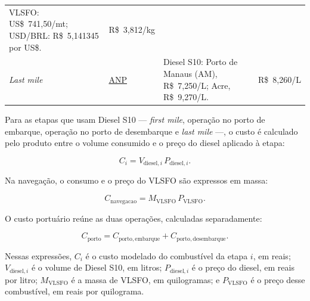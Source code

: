 \documentclass[brazil,]{article}
\begin{document}
\begin{longtable}[]{@{}llll@{}}
\begin{minipage}[t]{0.22\columnwidth}
VLSFO: US\$~741,50/mt; \newline{} USD/BRL: R\$~5,141345 por US\$.\strut
\end{minipage} & \begin{minipage}[t]{0.22\columnwidth}\raggedright
R\$~3,812/kg\strut
\end{minipage}\tabularnewline
\begin{minipage}[t]{0.22\columnwidth}\raggedright
\emph{Last mile}\strut
\end{minipage} & \begin{minipage}[t]{0.22\columnwidth}\raggedright
\href{https://www.gov.br/anp/pt-br/assuntos/precos-e-defesa-da-concorrencia/precos/levantamento-de-precos-de-combustiveis-ultimas-semanas-pesquisadas}{ANP}\strut
\end{minipage} & \begin{minipage}[t]{0.22\columnwidth}\raggedright
Diesel S10: \newline{} Porto de Manaus (AM), R\$~7,250/L; \newline{}
Acre, R\$~9,270/L.\strut
\end{minipage} & \begin{minipage}[t]{0.22\columnwidth}\raggedright
R\$~8,260/L\strut
\end{minipage}\tabularnewline
\bottomrule
\end{longtable}

Para as etapas que usam Diesel S10 --- \emph{first mile}, operação no
porto de embarque, operação no porto de desembarque e \emph{last mile}
---, o custo é calculado pelo produto entre o volume consumido e o preço
do diesel aplicado à etapa:

\[
C_i
=V_{\mathrm{diesel},i}\,P_{\mathrm{diesel},i}.
\]

Na navegação, o consumo e o preço do VLSFO são expressos em massa:

\[
C_{\mathrm{navegacao}}
=M_{\mathrm{VLSFO}}\,P_{\mathrm{VLSFO}}.
\]

O custo portuário reúne as duas operações, calculadas separadamente:

\[
C_{\mathrm{porto}}
=C_{\mathrm{porto,embarque}}
+C_{\mathrm{porto,desembarque}}.
\]

Nessas expressões, \(C_i\) é o custo modelado do combustível da etapa
\(i\), em reais; \(V_{\mathrm{diesel},i}\) é o volume de Diesel S10, em
litros; \(P_{\mathrm{diesel},i}\) é o preço do diesel, em reais por
litro; \(M_{\mathrm{VLSFO}}\) é a massa de VLSFO, em quilogramas; e
\(P_{\mathrm{VLSFO}}\) é o preço desse combustível, em reais por
quilograma.
\end{document}
